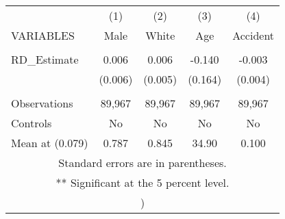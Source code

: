 \documentclass[]{article}
\begin{document}
\begin{tabular}{lcccc} \hline
 & (1) & (2) & (3) & (4) \\
VARIABLES & Male & White & Age & Accident \\ \hline
 &  &  &  &  \\
RD\_Estimate & 0.006 & 0.006 & -0.140 & -0.003 \\
 & (0.006) & (0.005) & (0.164) & (0.004) \\
 &  &  &  &  \\
Observations & 89,967 & 89,967 & 89,967 & 89,967 \\
Controls & No & No & No & No \\
 Mean at (0.079) & 0.787 & 0.845 & 34.90 & 0.100 \\ \hline
\multicolumn{5}{c}{ Standard errors are in parentheses.} \\
\multicolumn{5}{c}{ ** Significant at the 5 percent level.} \\
\multicolumn{5}{c}{ )} \\
\end{tabular}
\end{document}
